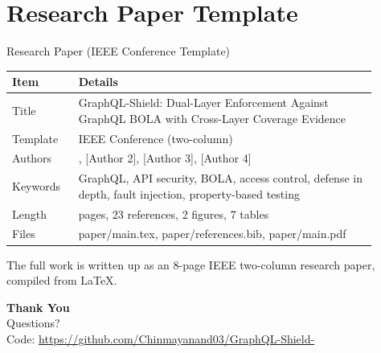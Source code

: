 \documentclass[aspectratio=169,11pt]{beamer}
\begin{document}
\section{Research Paper Template}
\begin{frame}{Research Paper (IEEE Conference Template)}
\begin{center}
\small
\renewcommand{\arraystretch}{1.12}
\begin{tabular}{>{\raggedright\arraybackslash}p{0.160\linewidth}>{\raggedright\arraybackslash}p{0.738\linewidth}}
\toprule
\textbf{Item} & \textbf{Details} \\
\midrule
Title & GraphQL-Shield: Dual-Layer Enforcement Against GraphQL BOLA with Cross-Layer Coverage Evidence \\
\rowcolor{rowgrey}Template & IEEE Conference (two-column) \\
Authors & [Author 1], [Author 2], [Author 3], [Author 4] \\
\rowcolor{rowgrey}Keywords & GraphQL, API security, BOLA, access control, defense in depth, fault injection, property-based testing \\
Length & 8 pages, 23 references, 2 figures, 7 tables \\
\rowcolor{rowgrey}Files & paper/main.tex, paper/references.bib, paper/main.pdf \\
\bottomrule
\end{tabular}
\end{center}
\begin{simplebox}The full work is written up as an 8-page IEEE two-column research paper, compiled from LaTeX.\end{simplebox}
\end{frame}

\begin{frame}
  \centering
  \vfill
  {\Huge\textbf{\color{navy}Thank You}}\\[12pt]
  {\Large Questions?}\\[18pt]
  \small Code: \url{https://github.com/Chinmayanand03/GraphQL-Shield-}
  \vfill
\end{frame}
\end{document}
